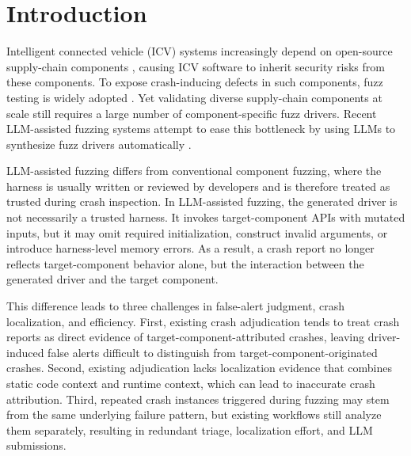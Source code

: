 \documentclass[pdflatex,sn-basic]{sn-jnl}%
\theoremstyle{thmstyleone}%
\theoremstyle{thmstyletwo}%
\theoremstyle{thmstylethree}%
\begin{document}
\maketitle


\section{Introduction}
\label{sec:introduction}

Intelligent connected vehicle (ICV) systems increasingly depend on open-source supply-chain components \citep{ref1,ref2,ref3,ref4,ref32}, causing ICV software to inherit security risks from these components. To expose crash-inducing defects in such components, fuzz testing is widely adopted \citep{ref16,ref17,ref7}. Yet validating diverse supply-chain components at scale still requires a large number of component-specific fuzz drivers. Recent LLM-assisted fuzzing systems attempt to ease this bottleneck by using LLMs to synthesize fuzz drivers automatically \citep{ref8,ref9,ref10,ref11,ref12}.

LLM-assisted fuzzing differs from conventional component fuzzing, where the harness is usually written or reviewed by developers and is therefore treated as trusted during crash inspection. In LLM-assisted fuzzing, the generated driver is not necessarily a trusted harness. It invokes target-component APIs with mutated inputs, but it may omit required initialization, construct invalid arguments, or introduce harness-level memory errors. As a result, a crash report no longer reflects target-component behavior alone, but the interaction between the generated driver and the target component.

This difference leads to three challenges in false-alert judgment, crash localization, and efficiency. First, existing crash adjudication tends to treat crash reports as direct evidence of target-component-attributed crashes, leaving driver-induced false alerts difficult to distinguish from target-component-originated crashes. Second, existing adjudication lacks localization evidence that combines static code context and runtime context, which can lead to inaccurate crash attribution. Third, repeated crash instances triggered during fuzzing may stem from the same underlying failure pattern, but existing workflows still analyze them separately, resulting in redundant triage, localization effort, and LLM submissions.
\end{document}
